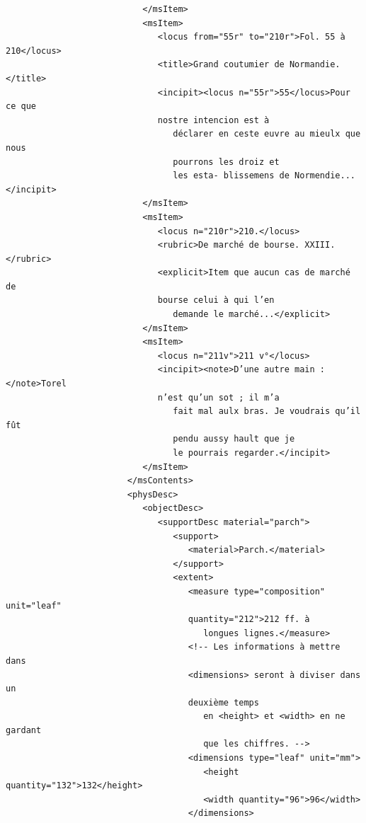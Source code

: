 \documentclass[a4paper,12pt,twoside]{book}
\begin{document}
\begin{verbatim}
                           </msItem>
                           <msItem>
                              <locus from="55r" to="210r">Fol. 55 à 210</locus>
                              <title>Grand coutumier de Normandie.</title>
                              <incipit><locus n="55r">55</locus>Pour ce que 
                              nostre intencion est à
                                 déclarer en ceste euvre au mieulx que nous
                                 pourrons les droiz et
                                 les esta- blissemens de Normendie...</incipit>
                           </msItem>
                           <msItem>
                              <locus n="210r">210.</locus>
                              <rubric>De marché de bourse. XXIII.</rubric>
                              <explicit>Item que aucun cas de marché de
                              bourse celui à qui l’en
                                 demande le marché...</explicit>
                           </msItem>
                           <msItem>
                              <locus n="211v">211 v°</locus>
                              <incipit><note>D’une autre main :</note>Torel 
                              n’est qu’un sot ; il m’a
                                 fait mal aulx bras. Je voudrais qu’il fût
                                 pendu aussy hault que je
                                 le pourrais regarder.</incipit>
                           </msItem>
                        </msContents>
                        <physDesc>
                           <objectDesc>
                              <supportDesc material="parch">
                                 <support>
                                    <material>Parch.</material>
                                 </support>
                                 <extent>
                                    <measure type="composition" unit="leaf" 
                                    quantity="212">212 ff. à
                                       longues lignes.</measure>
                                    <!-- Les informations à mettre dans 
                                    <dimensions> seront à diviser dans un
                                    deuxième temps 
                                       en <height> et <width> en ne gardant 
                                       que les chiffres. -->
                                    <dimensions type="leaf" unit="mm">
                                       <height quantity="132">132</height>
                                       <width quantity="96">96</width>
                                    </dimensions>

\end{verbatim}
\end{document}
